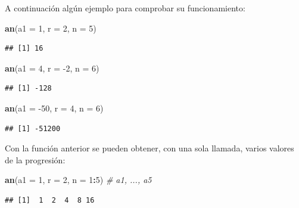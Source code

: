 \documentclass[]{book}
\newenvironment{Shaded}{\begin{snugshade}}{\end{snugshade}}
\newcommand{\CommentTok}[1]{\textcolor[rgb]{0.56,0.35,0.01}{\textit{#1}}}
\newcommand{\DataTypeTok}[1]{\textcolor[rgb]{0.13,0.29,0.53}{#1}}
\newcommand{\DecValTok}[1]{\textcolor[rgb]{0.00,0.00,0.81}{#1}}
\newcommand{\KeywordTok}[1]{\textcolor[rgb]{0.13,0.29,0.53}{\textbf{#1}}}
\newcommand{\NormalTok}[1]{#1}
\newcommand{\OperatorTok}[1]{\textcolor[rgb]{0.81,0.36,0.00}{\textbf{#1}}}
\begin{document}
A continuación algún ejemplo para comprobar su funcionamiento:

\begin{Shaded}
\begin{Highlighting}[]
\KeywordTok{an}\NormalTok{(}\DataTypeTok{a1 =} \DecValTok{1}\NormalTok{, }\DataTypeTok{r =} \DecValTok{2}\NormalTok{, }\DataTypeTok{n =} \DecValTok{5}\NormalTok{)}
\end{Highlighting}
\end{Shaded}

\begin{verbatim}
## [1] 16
\end{verbatim}

\begin{Shaded}
\begin{Highlighting}[]
\KeywordTok{an}\NormalTok{(}\DataTypeTok{a1 =} \DecValTok{4}\NormalTok{, }\DataTypeTok{r =} \DecValTok{-2}\NormalTok{, }\DataTypeTok{n =} \DecValTok{6}\NormalTok{)}
\end{Highlighting}
\end{Shaded}

\begin{verbatim}
## [1] -128
\end{verbatim}

\begin{Shaded}
\begin{Highlighting}[]
\KeywordTok{an}\NormalTok{(}\DataTypeTok{a1 =} \DecValTok{-50}\NormalTok{, }\DataTypeTok{r =} \DecValTok{4}\NormalTok{, }\DataTypeTok{n =} \DecValTok{6}\NormalTok{)}
\end{Highlighting}
\end{Shaded}

\begin{verbatim}
## [1] -51200
\end{verbatim}

Con la función anterior se pueden obtener, con una sola llamada, varios valores de
la progresión:

\begin{Shaded}
\begin{Highlighting}[]
\KeywordTok{an}\NormalTok{(}\DataTypeTok{a1 =} \DecValTok{1}\NormalTok{, }\DataTypeTok{r =} \DecValTok{2}\NormalTok{, }\DataTypeTok{n =} \DecValTok{1}\OperatorTok{:}\DecValTok{5}\NormalTok{)    }\CommentTok{# a1, ..., a5}
\end{Highlighting}
\end{Shaded}

\begin{verbatim}
## [1]  1  2  4  8 16
\end{verbatim}
\end{document}
